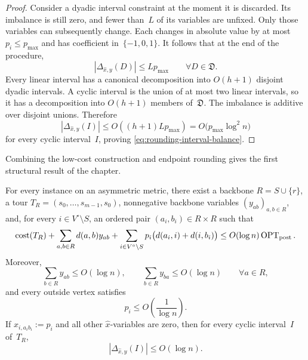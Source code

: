 \documentclass[12pt,a4paper,oneside]{report}
\begin{document}
\begin{proof}
Consider a dyadic interval constraint at the moment it is discarded.  Its imbalance is
still zero, and fewer than~$L$ of its variables are unfixed.  Only those
variables can subsequently change.  Each changes in absolute value by at
most $p_i\le p_{\max}$ and has coefficient in~$\{-1,0,1\}$.  It follows that
at the end of the procedure,
\[
    |\Delta_{\widehat x,y}(D)|\le Lp_{\max}
    \qquad\forall D\in\mathfrak D.
\]
Every linear interval has a canonical decomposition into $O(h+1)$ disjoint
dyadic intervals.  A cyclic interval is the union of at most two linear
intervals, so it has a decomposition into $O(h+1)$ members of~$\mathfrak D$.
The imbalance is additive over disjoint unions.  Therefore
\[
    |\Delta_{\widehat x,y}(I)|
    \le O((h+1)Lp_{\max})
    =O\bigl(p_{\max}\log^2 n\bigr)
\]
for every cyclic interval~$I$, proving
\cref{eq:rounding-interval-balance}.
\end{proof}

Combining the low-cost construction and endpoint rounding gives the first
structural result of the chapter.

\begin{theorem}
\label{thm:backbone-circulation-rounding}
For every \StochTSP{} instance on an asymmetric metric, there exist a backbone
$R=S\cup\{r\}$, a tour
$T_R=(s_0,\ldots,s_{m-1},s_0)$, nonnegative backbone variables
$(y_{ab})_{a,b\in R}$, and, for every
$i\in V^\circ\setminus S$, an
ordered pair $(a_i,b_i)\in R\times R$ such that
\begin{align}
    \operatorname{cost}(T_R)
    +\sum_{a,b\in R}d(a,b)y_{ab}
    +\sum_{i\in V^\circ\setminus S}
       p_i\bigl(d(a_i,i)+d(i,b_i)\bigr)
    \le O(\log n)\operatorname{OPT}_\mathrm{post}.
    \label{eq:partial-circulation-total-cost}
\end{align}
Moreover,
\begin{equation}\label{eq:rounded-backbone-degree}
    \sum_{b\in R}y_{ab}\le O(\log n),
    \qquad
    \sum_{b\in R}y_{ba}\le O(\log n)
    \qquad\forall a\in R,
\end{equation}
and every outside vertex satisfies
\begin{equation}\label{eq:rounded-small-probability}
    p_i\le O\left(\frac1{\log n}\right).
\end{equation}
If $\widehat x_{i,a_i b_i}:=p_i$ and all other $\widehat x$-variables are
zero, then for every cyclic interval~$I$ of~$T_R$,
\[
    |\Delta_{\widehat x,y}(I)|
    \le O(\log n).
\]
\end{theorem}
\end{document}
